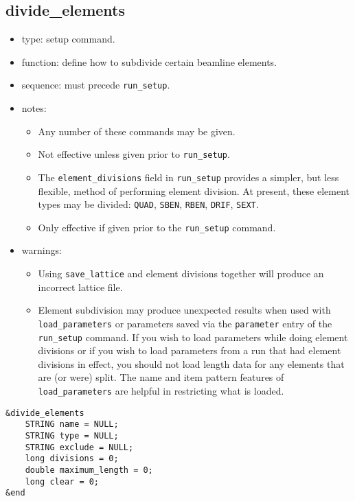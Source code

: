 \documentclass[11pt]{article}
\begin{document}
\subsection{divide\_elements \label{subsec:divideelements}}

\begin{itemize}
\item type: setup command.
\item function: define how to subdivide certain beamline elements.
\item sequence: must precede \verb|run_setup|.
\item notes: 
	\begin{itemize}
	\item Any number of these commands may be given.  
	\item Not effective unless given prior to \verb|run_setup|.
	\item The \verb|element_divisions|
 field in \verb|run_setup| provides a simpler, but less flexible, method of performing
 element division.  At present, these element types may be divided: 
 \verb|QUAD|, \verb|SBEN|, \verb|RBEN|, \verb|DRIF|,  \verb|SEXT|.
	\item Only effective if given prior to the \verb|run_setup| command.
	\end{itemize}
\item warnings:	
	\begin{itemize}
	\item Using \verb|save_lattice| and element divisions together will
	produce an incorrect lattice file.
	\item Element subdivision may
	produce unexpected results when used with \verb|load_parameters|
	or parameters saved via the \verb|parameter|
	entry of the \verb|run_setup| command.
	If you wish to load parameters while doing element divisions or if
	you wish to load parameters from a run that had element divisions
	in effect, you should not load length data for any elements that
	are (or were) split.  The name and item pattern features of 
	\verb|load_parameters| are helpful in restricting what is loaded.
	\end{itemize}
\end{itemize}

\begin{verbatim}
&divide_elements
    STRING name = NULL;
    STRING type = NULL;
    STRING exclude = NULL;
    long divisions = 0;
    double maximum_length = 0;
    long clear = 0;
&end
\end{verbatim}
\end{document}
